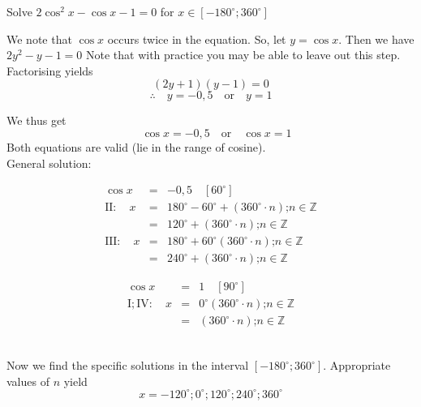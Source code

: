 \begin{wex}{}
{
Solve $2\cos^2x-\cos x - 1 = 0$ for $x\in [-180^\circ;360^\circ]$\\
}
{
We note that $\cos x$ occurs twice in the equation. So, let $y=\cos x$. Then we have $2y^2-y-1=0$
Note that with practice you may be able to leave out this step.\\

Factorising yields
\[(2y+1)(y-1)=0 \]
\[\therefore \quad y = -0,5 \quad \mbox{or} \quad y=1 \]

We thus get
\[ \quad \cos x = -0,5 \quad \mbox{or} \quad \cos x=1 \]
Both equations are valid (\ie lie in the range of cosine).\\
General solution:

\begin{minipage}{0.6\textwidth}
\begin{eqnarray*}
\cos x &=& -0,5 \quad [60^\circ]\\
\mathrm{II:} \quad x &=& 180^\circ - 60^\circ +(360^\circ\cdot n) \mbox{;} n\in\mathbb{Z}\\
&=& 120^\circ +(360^\circ\cdot n) \mbox{;} n\in\mathbb{Z}\\
\mathrm{III:} \quad x &=& 180^\circ + 60^\circ (360^\circ\cdot n) \mbox{;} n\in\mathbb{Z}\\
&=& 240^\circ +(360^\circ\cdot n) \mbox{;} n\in\mathbb{Z}
\end{eqnarray*}
\end{minipage}
\begin{minipage}{0.4\textwidth}
\begin{eqnarray*}
\cos x &=& 1 \quad [90^\circ] \\
\mathrm{I; IV:} \quad x &=& 0^\circ  (360^\circ\cdot n) \mbox{;} n\in\mathbb{Z}\\
&=& (360^\circ\cdot n) \mbox{;} n\in\mathbb{Z}
\end{eqnarray*}
\end{minipage}\\

Now we find the specific solutions in the interval $[-180^\circ;360^\circ]$. Appropriate values of $n$ yield
\[x= -120^\circ; 0^\circ; 120^\circ; 240^\circ; 360^\circ \]
}
\end{wex}

